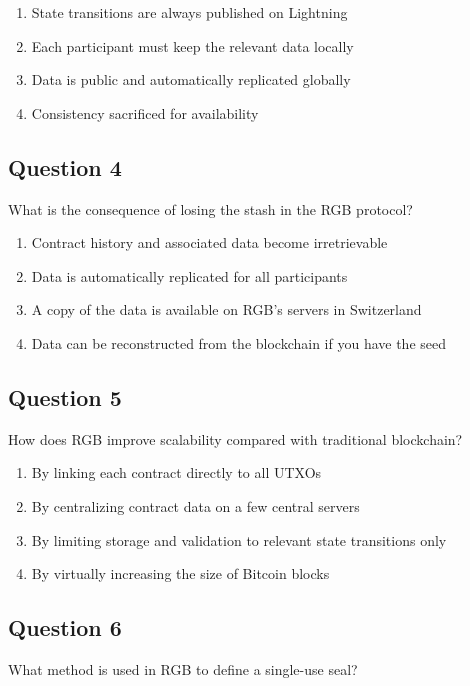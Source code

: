 \documentclass[12pt,a4paper]{article}
\begin{document}
\begin{enumerate}[label=\Alph*., leftmargin=*]
\item State transitions are always published on Lightning
\item Each participant must keep the relevant data locally
\item Data is public and automatically replicated globally
\item Consistency sacrificed for availability
\end{enumerate}

\bigskip


\subsection*{Question 4}
What is the consequence of losing the stash in the RGB protocol?

\begin{enumerate}[label=\Alph*., leftmargin=*]
\item Contract history and associated data become irretrievable
\item Data is automatically replicated for all participants
\item A copy of the data is available on RGB's servers in Switzerland
\item Data can be reconstructed from the blockchain if you have the seed
\end{enumerate}

\bigskip


\subsection*{Question 5}
How does RGB improve scalability compared with traditional blockchain?

\begin{enumerate}[label=\Alph*., leftmargin=*]
\item By linking each contract directly to all UTXOs
\item By centralizing contract data on a few central servers
\item By limiting storage and validation to relevant state transitions only
\item By virtually increasing the size of Bitcoin blocks
\end{enumerate}

\bigskip


\subsection*{Question 6}
What method is used in RGB to define a single-use seal?
\end{document}
